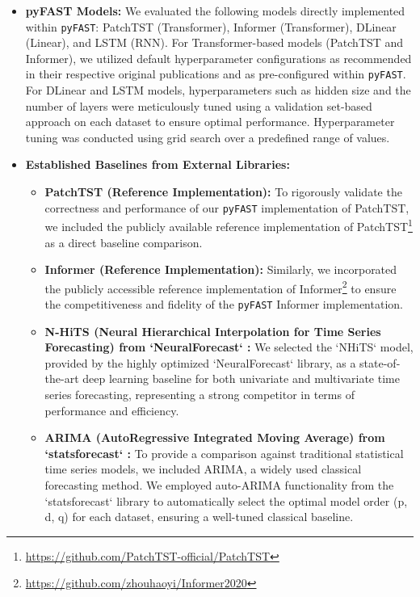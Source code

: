 \documentclass[twoside,11pt]{article}
\begin{document}
\begin{itemize}
        \item   \textbf{pyFAST Models:}  We evaluated the following models directly implemented within \texttt{pyFAST}: PatchTST (Transformer), Informer (Transformer), DLinear (Linear), and LSTM (RNN). For Transformer-based models (PatchTST and Informer), we utilized default hyperparameter configurations as recommended in their respective original publications and as pre-configured within \texttt{pyFAST}. For DLinear and LSTM models, hyperparameters such as hidden size and the number of layers were meticulously tuned using a validation set-based approach on each dataset to ensure optimal performance.  Hyperparameter tuning was conducted using grid search over a predefined range of values.
\item   \textbf{Established Baselines from External Libraries:}
    \begin{itemize}
        \item   \textbf{PatchTST (Reference Implementation):} To rigorously validate the correctness and performance of our \texttt{pyFAST} implementation of PatchTST, we included the publicly available reference implementation of PatchTST\footnote{\url{https://github.com/PatchTST-official/PatchTST}} as a direct baseline comparison.
        \item   \textbf{Informer (Reference Implementation):}  Similarly, we incorporated the publicly accessible reference implementation of Informer\footnote{\url{https://github.com/zhouhaoyi/Informer2020}} to ensure the competitiveness and fidelity of the \texttt{pyFAST} Informer implementation.
        \item  \textbf{N-HiTS (Neural Hierarchical Interpolation for Time Series Forecasting) from `NeuralForecast` \citep{olivares2022library_neuralforecast}:}  We selected the `NHiTS` model, provided by the highly optimized `NeuralForecast` library, as a state-of-the-art deep learning baseline for both univariate and multivariate time series forecasting, representing a strong competitor in terms of performance and efficiency.
        \item  \textbf{ARIMA (AutoRegressive Integrated Moving Average) from `statsforecast` \citep{garza2022statsforecast}:}  To provide a comparison against traditional statistical time series models, we included ARIMA, a widely used classical forecasting method. We employed auto-ARIMA functionality from the `statsforecast` library to automatically select the optimal model order (p, d, q) for each dataset, ensuring a well-tuned classical baseline.
    \end{itemize}
\end{itemize}
    
\end{document}
